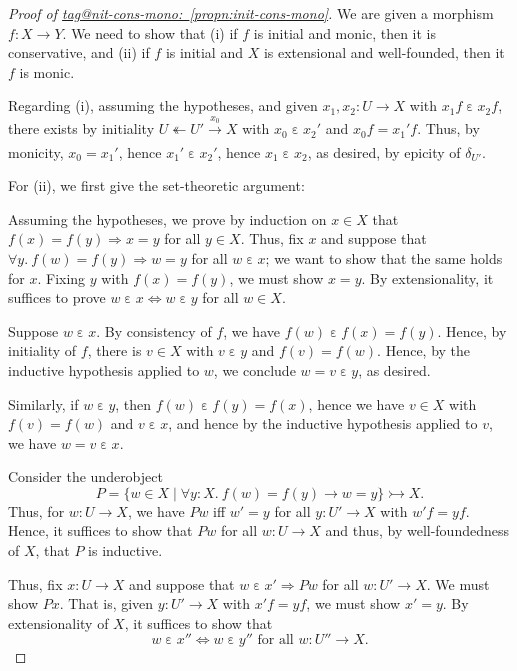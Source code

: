 \documentclass{amsart}
\makeatletter
\newcommand\ein{\mathrel{\varepsilon}}
\newcommand\FORALL{\text{ for all }}
\newcommand\oot{\twoheadleftarrow}
\newcommand\set[2][]{#1\{ #2 #1\}}
\newcommand\ToT{\Leftrightarrow}
\newcommand\tox[2][]{\xrightarrow[#1]{#2}}
\newcommand\To{\Rightarrow}
\newcommand\tto{\rightarrowtail}
\newcommand\tagword[1]{\csname tag@#1\endcsname}
\def\label@tag#1:#2\@nil{#1}
\newcommand\labeltag[1]{\label@tag#1:\@nil}
\newcommand\jref[1]{%
  \texorpdfstring%
    {\hyperref[#1]{\tagword{\labeltag{#1}}~\ref*{#1}}}%
    {\tagword{\labeltag{#1}}~\ref*{#1}}%
}
\theoremstyle{definition}
\theoremstyle{remark}
\theoremstyle{plainwithref}
\newenvironment{settybox}{\begin{tcolorbox}[colback=blue!20,breakable%
    ,enhanced%
    ,sharp corners%
    ,frame hidden%
    ,boxsep=0pt
    ,left=5pt,right=5pt,top=5pt,bottom=5pt
    ,enlarge left by=-5pt,width=\linewidth+10pt
    ,enlarge top by=5pt,enlarge bottom by=5pt
    ,before skip balanced=0pt,after skip balanced=0pt
    ]}{\end{tcolorbox}}
\makeatother
\begin{document}
\begin{proof}[Proof of \jref{propn:init-cons-mono}] \label{proof:init-cons-mono}
  We are given a morphism \( f \colon X \to Y \).
  We need to show that (i) if \( f \) is initial and monic, then it is conservative, and (ii) if \( f \) is initial and \( X \) is extensional and well-founded, then it \( f \) is monic.

  Regarding (i), assuming the hypotheses, and given \( x_1,x_2 \colon U \to X \) with \( x_1 f \ein x_2 f \), there exists by initiality \( U \oot U' \tox{x_0} X \) with \( x_0 \ein x_2' \) and \( x_0 f = x_1' f \).
  Thus, by monicity, \( x_0 = x_1' \), hence \( x_1' \ein x_2' \), hence \( x_1 \ein x_2 \), as desired, by epicity of \( \delta_{U'} \).

  For (ii), we first give the set-theoretic argument:
  \begin{settybox}
    Assuming the hypotheses, we prove by induction on \( x \in X \) that \( f(x) = f(y) \To x = y \) for all \( y \in X \).
    Thus, fix \( x \) and suppose that \( \forall y.\ f(w) = f(y) \To w = y \) for all \( w \ein x \); we want to show that the same holds for \( x \).
    Fixing \( y \) with \( f(x) = f(y) \), we must show \( x = y \).
    By extensionality, it suffices to prove \( w \ein x \ToT w \ein y \) for all \( w \in X \).

    Suppose \( w \ein x \).
    By consistency of \( f \), we have \( f(w) \ein f(x) = f(y) \).
    Hence, by initiality of \( f \), there is \( v \in X \) with \( v \ein y \) and \( f(v) = f(w) \).
    Hence, by the inductive hypothesis applied to \( w \), we conclude \( w = v \ein y \), as desired.

    Similarly, if \( w \ein y \), then \( f(w) \ein f(y) = f(x) \), hence we have \( v \in X \) with \( f(v) = f(w) \) and \( v \ein x \), and hence by the inductive hypothesis applied to \( v \), we have \( w = v \ein x \).
  \end{settybox}
  Consider the underobject
  \[
    P = \set{ w \in X \mid \forall y \colon X.\ f(w) = f(y) \to w = y} \tto X.
  \]
  Thus, for \( w \colon U \to X \), we have \( P w \) iff \( w' = y \) for all \( y \colon U' \to X \) with \( w' f = y f \).
  Hence, it suffices to show that \( P w \) for all \( w \colon U \to X \) and thus, by well-foundedness of \( X \), that \( P \) is inductive.

  Thus, fix \( x \colon U \to X \) and suppose that \( w \ein x' \To P w \) for all \( w \colon U' \to X \).
  We must show \( P x \).
  That is, given \( y \colon U' \to X \) with \( x' f = y f \), we must show \( x' = y \).
  By extensionality of \( X \), it suffices to show that
  \[
    w \ein x'' \iff w \ein y'' \FORALL w \colon U'' \to X.
  \]


\end{proof}
\end{document}
